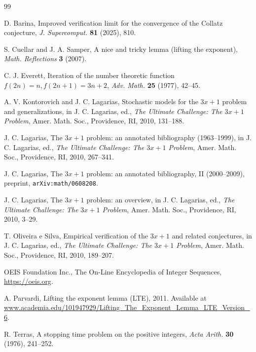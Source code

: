 \documentclass[11pt]{article}
\theoremstyle{plain}
\theoremstyle{definition}
\theoremstyle{remark}
\begin{document}
\begin{thebibliography}{99}\footnotesize

D. Barina, Improved verification limit for the convergence of the Collatz conjecture, {\it J. Supercomput.} {\bf 81} (2025), 810.

S. Cuellar and J. A. Samper, A nice and tricky lemma (lifting the exponent), {\it Math. Reflections} {\bf 3} (2007).

C. J. Everett, Iteration of the number theoretic function $f(2n)=n, f(2n+1)=3n+2$, {\it Adv. Math.} {\bf 25} (1977), 42--45.

A. V. Kontorovich and J. C. Lagarias, Stochastic models for the $3x+1$ problem and generalizations, in J. C. Lagarias, ed., {\it The Ultimate Challenge: The $3x+1$ Problem}, Amer. Math. Soc., Providence, RI, 2010, 131--188.

J. C. Lagarias, The $3x+1$ problem: an annotated bibliography (1963--1999), in J. C. Lagarias, ed., {\it The Ultimate Challenge: The $3x+1$ Problem}, Amer. Math. Soc., Providence, RI, 2010, 267--341.

J. C. Lagarias, The $3x+1$ problem: an annotated bibliography, II (2000--2009), preprint, {\tt arXiv:math/0608208}.

J. C. Lagarias, The $3x+1$ problem: an overview, in J. C. Lagarias, ed., {\it The Ultimate Challenge: The $3x+1$ Problem}, Amer. Math. Soc., Providence, RI, 2010, 3--29.

T. Oliveira e Silva, Empirical verification of the $3x+1$ and related conjectures, in J. C. Lagarias, ed., {\it The Ultimate Challenge: The $3x+1$ Problem}, Amer. Math. Soc., Providence, RI, 2010, 189--207.

OEIS Foundation Inc., The On-Line Encyclopedia of Integer Sequences, \url{https://oeis.org}.

A. Parvardi, Lifting the exponent lemma (LTE), 2011. Available at \url{www.academia.edu/101947929/Lifting_The_Exponent_Lemma_LTE_Version_6}.

R. Terras, A stopping time problem on the positive integers, {\it Acta Arith.} {\bf 30} (1976), 241--252.

\end{thebibliography}
\end{document}
